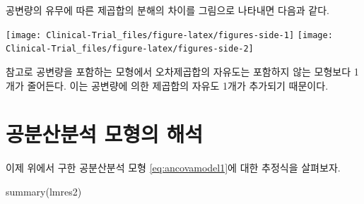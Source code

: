 \documentclass[
]{book}
\newenvironment{Shaded}{\begin{snugshade}}{\end{snugshade}}
\newcommand{\AttributeTok}[1]{\textcolor[rgb]{0.77,0.63,0.00}{#1}}
\newcommand{\DecValTok}[1]{\textcolor[rgb]{0.00,0.00,0.81}{#1}}
\newcommand{\FunctionTok}[1]{\textcolor[rgb]{0.00,0.00,0.00}{#1}}
\newcommand{\NormalTok}[1]{#1}
\newcommand{\OtherTok}[1]{\textcolor[rgb]{0.56,0.35,0.01}{#1}}
\newcommand{\SpecialCharTok}[1]{\textcolor[rgb]{0.00,0.00,0.00}{#1}}
\newcommand{\StringTok}[1]{\textcolor[rgb]{0.31,0.60,0.02}{#1}}
\begin{document}
공변량의 유무에 따른 제곱합의 분해의 차이를 그림으로 나타내면 다음과 같다.

\begin{Shaded}
\end{Shaded}

\texttt{[image: Clinical-Trial\_files/figure-latex/figures-side-1]} \texttt{[image: Clinical-Trial\_files/figure-latex/figures-side-2]}

참고로 공변량을 포함하는 모형에서 오차제곱합의 자유도는 포함하지 않는 모형보다 1개가 줄어든다.
이는 공변량에 의한 제곱합의 자유도 1개가 추가되기 때문이다.

\hypertarget{uxacf5uxbd84uxc0b0uxbd84uxc11d-uxbaa8uxd615uxc758-uxd574uxc11d}{%
\section{공분산분석 모형의 해석}\label{uxacf5uxbd84uxc0b0uxbd84uxc11d-uxbaa8uxd615uxc758-uxd574uxc11d}}

이제 위에서 구한 공분산분석 모형 \eqref{eq:ancovamodel1}에 대한 추정식을 살펴보자.

\begin{Shaded}
\begin{Highlighting}[]
\FunctionTok{summary}\NormalTok{(lmres2)}
\end{Highlighting}
\end{Shaded}
\end{document}
